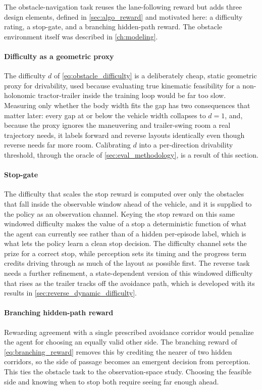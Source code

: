 The obstacle-navigation task reuses the lane-following reward but adds three design elements, defined in \cref{sec:algo_reward} and motivated here: a difficulty rating, a stop-gate, and a branching hidden-path reward. The obstacle environment itself was described in \cref{ch:modeling}.


\paragraph{Difficulty as a geometric proxy}
The difficulty $d$ of \cref{eq:obstacle_difficulty} is a deliberately cheap, static geometric proxy for drivability, used because evaluating true kinematic feasibility for a non-holonomic tractor-trailer inside the training loop would be far too slow. Measuring only whether the body width fits the gap has two consequences that matter later: every gap at or below the vehicle width collapses to $d=1$, and, because the proxy ignores the maneuvering and trailer-swing room a real trajectory needs, it labels forward and reverse layouts identically even though reverse needs far more room. Calibrating $d$ into a per-direction drivability threshold, through the oracle of \cref{sec:eval_methodology}, is a result of this section.

\paragraph{Stop-gate}
The difficulty that scales the stop reward is computed over only the obstacles that fall inside the observable window ahead of the vehicle, and it is supplied to the policy as an observation channel. Keying the stop reward on this same windowed difficulty makes the value of a stop a deterministic function of what the agent can currently see rather than of a hidden per-episode label, which is what lets the policy learn a clean stop decision. The difficulty channel sets the prize for a correct stop, while perception sets its timing and the progress term credits driving through as much of the layout as possible first. The reverse task needs a further refinement, a state-dependent version of this windowed difficulty that rises as the trailer tracks off the avoidance path, which is developed with its results in \cref{sec:reverse_dynamic_difficulty}.

\paragraph{Branching hidden-path reward}
Rewarding agreement with a single prescribed avoidance corridor would penalize the agent for choosing an equally valid other side. The branching reward of \cref{eq:branching_reward} removes this by crediting the nearer of two hidden corridors, so the side of passage becomes an emergent decision from perception. This ties the obstacle task to the observation-space study. Choosing the feasible side and knowing when to stop both require seeing far enough ahead.


